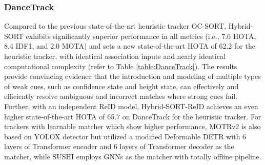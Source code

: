 \documentclass[letterpaper]{article} \usepackage{aaai23}  \usepackage{times}  \usepackage{helvet}  \usepackage{courier}  \usepackage[hyphens]{url}  \usepackage{graphicx} \urlstyle{rm} \def\UrlFont{\rm}  \usepackage{natbib}  \usepackage{caption} \frenchspacing  \setlength{\pdfpagewidth}{8.5in}  \setlength{\pdfpageheight}{11in}  \usepackage{algorithm}
\begin{document}
\subsubsection{DanceTrack}
Compared to the previous state-of-the-art heuristic tracker OC-SORT, Hybrid-SORT exhibits significantly superior performance in all metrics (i.e., 7.6 HOTA, 8.4 IDF1, and 2.0 MOTA) and sets a new state-of-the-art HOTA of 62.2 for the heuristic tracker, with identical association inputs and nearly identical computational complexity (refer to Table \ref{table:DanceTrack}). The results provide convincing evidence that the introduction and modeling of multiple types of weak cues, such as confidence state and height state, can effectively and efficiently resolve ambiguous and incorrect matches where strong cues fail. Further, with an independent ReID model, Hybrid-SORT-ReID achieves an even higher state-of-the-art HOTA of 65.7 on DanceTrack for the heuristic tracker. For trackers with learnable matcher which show higher performance, MOTRv2 is also based on YOLOX detector but utilized a modified Deformable DETR \textcolor{blue}{\cite{zhu2020deformable}} with 6 layers of Transformer encoder and 6 layers of Transformer decoder as the matcher, while SUSHI employs GNNs as the matcher with totally offline pipeline. 
\end{document}
